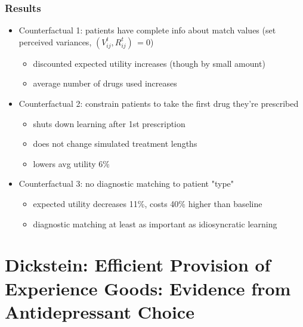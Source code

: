 \documentclass[aspectratio=169,11pt]{beamer}
\begin{document}
\begin{frame}
\frametitle{Results}

\begin{itemize}
\item Counterfactual 1: patients have complete info about match values (set
perceived variances, $(V_{ij}^{t},R_{ij}^{t})\,=0$)

\begin{itemize}
\item discounted expected utility increases (though by small amount)

\item average number of drugs used increases
\end{itemize}

\item Counterfactual 2: constrain patients to take the first drug they're
prescribed

\begin{itemize}
\item shuts down learning after 1st prescription

\item does not change simulated treatment lengths

\item lowers avg utility 6\%
\end{itemize}

\item Counterfactual 3: no diagnostic matching to patient "type"

\begin{itemize}
\item expected utility decreases 11\%, costs 40\% higher than baseline

\item diagnostic matching at least as important as idiosyncratic learning
\end{itemize}
\end{itemize}
\end{frame}




\section{Dickstein: Efficient Provision of Experience Goods: Evidence from
Antidepressant Choice}
\end{document}
